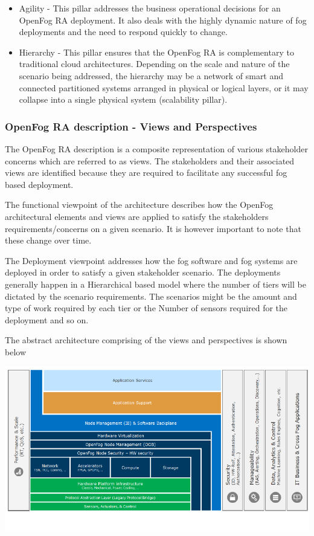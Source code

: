 \documentclass{article}
\begin{document}
\begin{itemize}
\item Agility - This pillar addresses the business operational decisions for an OpenFog RA deployment. It also deals with the highly dynamic nature of fog deployments and the need to respond quickly to change.

\item Hierarchy - This pillar ensures that the OpenFog RA is complementary to traditional cloud architectures. Depending on the scale and nature of the scenario being addressed, the hierarchy may be a network of smart and connected partitioned systems arranged in physical or logical layers, or it may collapse into a single physical system (scalability pillar).
\end{itemize}  

\subsubsection{OpenFog RA description - Views and Perspectives}

The OpenFog RA description is a composite representation of various stakeholder concerns which are referred to as views\cite{openfogconsortium2017}. The stakeholders and their associated views are identified because they are required to facilitate any successful fog based deployment\cite{openfogconsortium2017}. 

The functional viewpoint of the architecture describes how the OpenFog architectural elements and views are applied to satisfy the stakeholders requirements/concerns on a given scenario. It is however important to note that these change over time. 

The Deployment viewpoint addresses how the fog software and fog systems are deployed in order to satisfy a given stakeholder scenario. The deployments generally happen in a Hierarchical based model where the number of tiers will be dictated by the scenario requirements\cite{openfogconsortium2017}.
The scenarios might be the amount and type of work required by each tier or the Number of sensors required for the deployment and so on.

The abstract architecture comprising of the views and perspectives is shown below\cite{openfogconsortium2017}


\includegraphics[scale=0.7]{figa.png}
\end{document}
